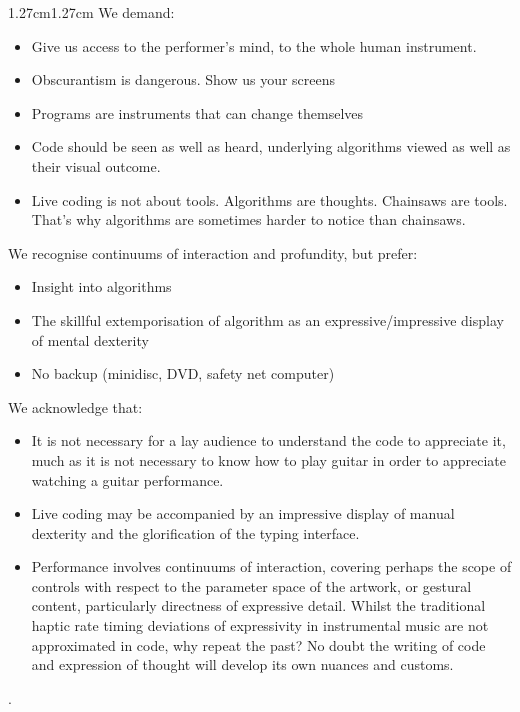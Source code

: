 \documentclass[12pt, twoside, a4paper]{report}
\begin{document}
\begin{adjustwidth}{1.27cm}{1.27cm}
We demand:
\begin{itemize}
   \renewcommand{\labelitemi}{--}
  \item Give us access to the performer's mind, to the whole human instrument.
  \item Obscurantism is dangerous. Show us your screens
  \item Programs are instruments that can change themselves
  \item Code should be seen as well as heard, underlying algorithms viewed as well as their visual outcome.
  \item  Live coding is not about tools. Algorithms are thoughts. Chainsaws are tools. That’s why algorithms are sometimes harder to notice than chainsaws.
\end{itemize} 
We recognise continuums of interaction and profundity, but prefer: 
\begin{itemize}
   \renewcommand{\labelitemi}{--}
  \item Insight into algorithms
    \item  The skillful extemporisation of algorithm as an expressive/impressive display of mental dexterity
    \item No backup (minidisc, DVD, safety net computer)
\end{itemize} 
 We acknowledge that: 
\begin{itemize}
   \renewcommand{\labelitemi}{--}
  \item    It is not necessary for a lay audience to understand the code to appreciate it, much as it is not necessary to know how to play guitar in order to appreciate watching a guitar performance.
   \item  Live coding may be accompanied by an impressive display of manual dexterity and the glorification of the typing interface.
    \item Performance involves continuums of interaction, covering perhaps the scope of controls with respect to the parameter space of the artwork, or gestural content, particularly directness of expressive detail. Whilst the traditional haptic rate timing deviations of expressivity in instrumental music are not approximated in code, why repeat the past? No doubt the writing of code and expression of thought will develop its own nuances and customs.
\end{itemize} 
\citep{history}.
\end{adjustwidth}
\end{document}
